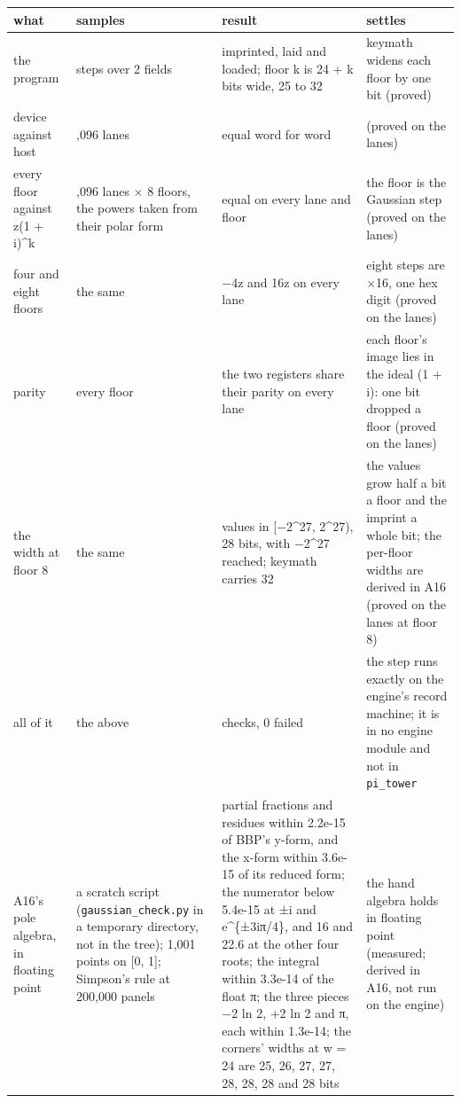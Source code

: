 {\footnotesize
\setlength{\tabcolsep}{6pt}
\begin{longtable}{>{\RaggedRight\arraybackslash}p{}>{\RaggedRight\arraybackslash}p{}>{\RaggedRight\arraybackslash}p{}>{\RaggedRight\arraybackslash}p{}}
\toprule
what & samples & result & settles \\
\midrule
\endhead
the program & 18 steps over 2 fields & imprinted, laid and loaded; floor k is 24 + k bits wide, 25 to 32 & keymath widens each floor by one bit (proved) \\
device against host & 4,096 lanes & equal word for word & (proved on the lanes) \\
every floor against z(1 + i)\textasciicircum{}k & 4,096 lanes × 8 floors, the powers taken from their polar form & equal on every lane and floor & the floor is the Gaussian step (proved on the lanes) \\
four and eight floors & the same & −4z and 16z on every lane & eight steps are ×16, one hex digit (proved on the lanes) \\
parity & every floor & the two registers share their parity on every lane & each floor's image lies in the ideal (1 + i): one bit dropped a floor (proved on the lanes) \\
the width at floor 8 & the same & values in [−2\textasciicircum{}27, 2\textasciicircum{}27), 28 bits, with −2\textasciicircum{}27 reached; keymath carries 32 & the values grow half a bit a floor and the imprint a whole bit; the per-floor widths are derived in A16 (proved on the lanes at floor 8) \\
all of it & the above & 8 checks, 0 failed & the step runs exactly on the engine's record machine; it is in no engine module and not in \texttt{pi\_\allowbreak{}tower} \\
A16's pole algebra, in floating point & a scratch script (\texttt{gaussian\_\allowbreak{}check.\allowbreak{}py} in a temporary directory, not in the tree); 1,001 points on [0, 1]; Simpson's rule at 200,000 panels & partial fractions and residues within 2.2e-15 of BBP's y-form, and the x-form within 3.6e-15 of its reduced form; the numerator below 5.4e-15 at ±i and e\textasciicircum{}\{±3iπ/4\}, and 16 and 22.6 at the other four roots; the integral within 3.3e-14 of the float π; the three pieces −2 ln 2, +2 ln 2 and π, each within 1.3e-14; the corners' widths at w = 24 are 25, 26, 27, 27, 28, 28, 28 and 28 bits & the hand algebra holds in floating point (measured; derived in A16, not run on the engine) \\
\bottomrule
\end{longtable}
}

